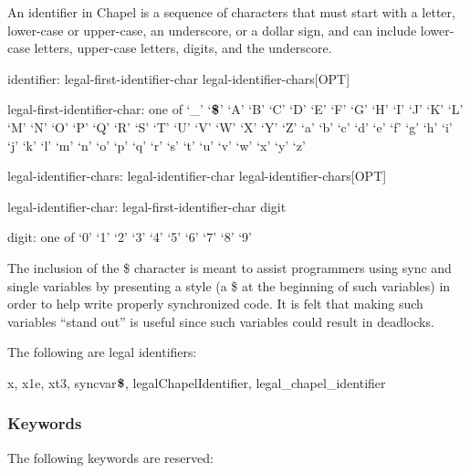 An identifier in Chapel is a sequence of characters that must start
with a letter, lower-case or upper-case, an underscore, or a dollar
sign, and can include lower-case letters, upper-case letters, digits,
and the underscore.
\begin{syntax}
identifier:
  legal-first-identifier-char legal-identifier-chars[OPT]

legal-first-identifier-char: one of
  `_' `$\mbox{{\bf \$}}$' `A' `B' `C' `D' `E' `F' `G' `H' `I' `J' `K' `L' `M' `N' `O' `P' `Q' `R' `S' `T' `U' `V' `W' `X' `Y' `Z' `a' `b' `c' `d' `e' `f' `g' `h' `i' `j' `k' `l' `m'
                           `n' `o' `p' `q' `r' `s' `t' `u' `v' `w' `x' `y' `z'

legal-identifier-chars:
  legal-identifier-char legal-identifier-chars[OPT]

legal-identifier-char:
  legal-first-identifier-char
  digit

digit: one of
  `0' `1' `2' `3' `4' `5' `6' `7' `8' `9'
\end{syntax}

\begin{rationale}
The inclusion of the \$ character is meant to assist programmers using
sync and single variables by presenting a style (a \$ at the beginning
of such variables) in order to help write properly synchronized code.
It is felt that making such variables ``stand out'' is useful since
such variables could result in deadlocks.
\end{rationale}

\begin{example}
The following are legal identifiers:
\begin{chapel}
  x, x1e, xt3, syncvar$\mbox{{\bf \$}}$, legalChapelIdentifier, legal_chapel_identifier
\end{chapel}
\end{example}

\subsubsection{Keywords}
\label{Keywords}

The following keywords are reserved:

